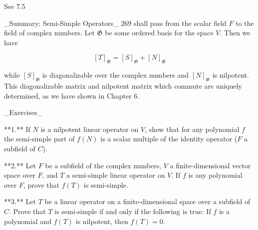 
See 7.5

_Summary; Semi-Simple Operators_ 269 shall pass from the scalar field \(F\) to the field of complex numbers. Let \(\mathfrak{G}\) be some ordered basis for the space \(V\). Then we have

\[[T]_{\mathfrak{G}}=[S]_{\mathfrak{G}}+[N]_{\mathfrak{G}}\]

while \([S]_{\mathfrak{G}}\) is diagonalizable over the complex numbers and \([N]_{\mathfrak{G}}\) is nilpotent. This diagonalizable matrix and nilpotent matrix which commute are uniquely determined, as we have shown in Chapter 6.

_Exercises_

**1.** If \(N\) is a nilpotent linear operator on \(V\), show that for any polynomial \(f\) the semi-simple part of \(f(N)\) is a scalar multiple of the identity operator (\(F\) a subfield of \(C\)).

**2.** Let \(F\) be a subfield of the complex numbers, \(V\) a finite-dimensional vector space over \(F\), and \(T\) a semi-simple linear operator on \(V\). If \(f\) is any polynomial over \(F\), prove that \(f(T)\) is semi-simple.

**3.** Let \(T\) be a linear operator on a finite-dimensional space over a subfield of \(C\). Prove that \(T\) is semi-simple if and only if the following is true: If \(f\) is a polynomial and \(f(T)\) is nilpotent, then \(f(T)=0\).

 